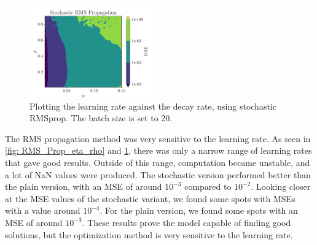 \begin{figure}[ht!]
    \centering
    \includegraphics[width = 0.475\textwidth]{../figs/RMS_Prop_stochastic_eta_rho.pdf}
    \caption{Plotting the learning rate against the decay rate, using stochastic RMSprop. The batch size is set to 20.}
    \label{fig: RMS_Prop_stochastic_eta_rho}
\end{figure}
The RMS propagation method was very sensitive to the learning rate. As seen in \cref{fig: RMS_Prop_eta_rho} and \cref{fig: RMS_Prop_stochastic_eta_rho}, there was only a narrow range of learning rates that gave good results. Outside of this range, computation became unstable, and a lot of NaN values were produced. The stochastic version performed better than the plain version, with an MSE of around \(10^{-3}\) compared to \(10^{-2}\). Looking closer at the MSE values of the stochastic variant, we found some spots with MSEs with a value around \( 10^{-4} \). For the plain version, we found some spots with an MSE of around \( 10^{-3} \). These results prove the model capable of finding good solutions, but the optimization method is very sensitive to the learning rate.


\clearpage
\onecolumngrid
